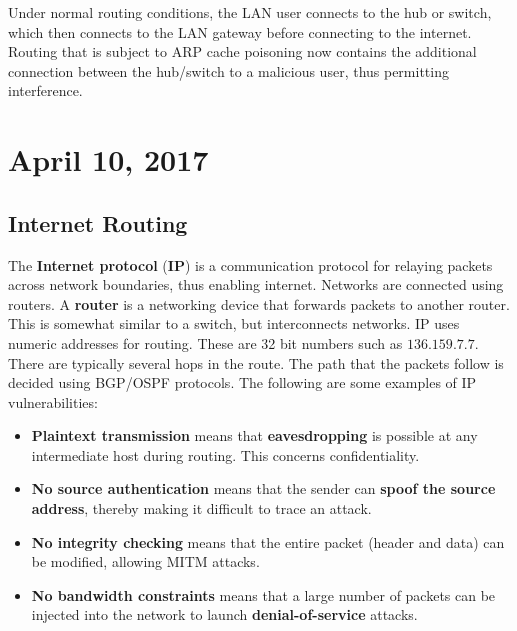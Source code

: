 \documentclass[11pt]{article}
\theoremstyle{plain} %
\theoremstyle{definition}
\theoremstyle{example}
\theoremstyle{remark}
\begin{document}
Under normal routing conditions, the LAN user connects to the hub or switch, which then connects to the LAN gateway before connecting to the internet. Routing that is subject to ARP cache poisoning now contains the additional connection between the hub/switch to a malicious user, thus permitting interference. 

\section{April 10, 2017}
\subsection{Internet Routing}
The \textbf{Internet protocol} (\textbf{IP}) is a communication protocol for relaying packets across network boundaries, thus enabling internet. Networks are connected using routers. A \textbf{router} is a networking device that forwards packets to another router. This is somewhat similar to a switch, but interconnects networks. IP uses numeric addresses for routing. These are 32 bit numbers such as $136.159.7.7$. There are typically several hops in the route. The path that the packets follow is decided using BGP/OSPF protocols. The following are some examples of IP vulnerabilities:
\begin{itemize}
	\item \textbf{Plaintext transmission} means that \textbf{eavesdropping} is possible at any intermediate host during routing. This concerns confidentiality. 
	\item \textbf{No source authentication} means that the sender can \textbf{spoof the source address}, thereby making it difficult to trace an attack. 
	\item \textbf{No integrity checking} means that the entire packet (header and data) can be modified, allowing MITM attacks. 
	\item \textbf{No bandwidth constraints} means that a large number of packets can be injected into the network to launch \textbf{denial-of-service} attacks. 
\end{itemize}
\end{document}
